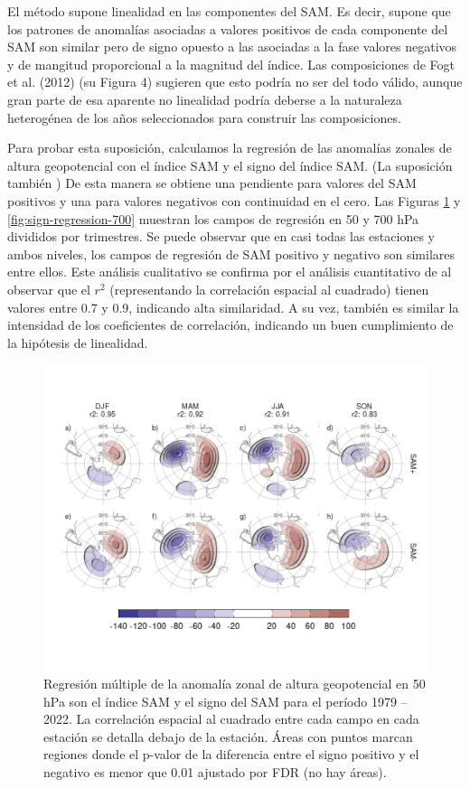 \documentclass[12pt,oneside]{reedthesis}
\begin{document}
El método supone linealidad en las componentes del SAM.
Es decir, supone que los patrones de anomalías asociadas a valores positivos de cada componente del SAM son similar pero de signo opuesto a las asociadas a la fase valores negativos y de mangitud proporcional a la magnitud del índice.
Las composiciones de Fogt et al. (2012) (su Figura 4) sugieren que esto podría no ser del todo válido, aunque gran parte de esa aparente no linealidad podría deberse a la naturaleza heterogénea de los años seleccionados para construir las composiciones.

Para probar esta suposición, calculamos la regresión de las anomalías zonales de altura geopotencial con el índice SAM y el signo del índice SAM.
(La suposición también )
De esta manera se obtiene una pendiente para valores del SAM positivos y una para valores negativos con continuidad en el cero.
Las Figuras \ref{fig:sign-regression-50} y \ref{fig:sign-regression-700} muestran los campos de regresión en 50 y 700 hPa divididos por trimestres.
Se puede observar que en casi todas las estaciones y ambos niveles, los campos de regresión de SAM positivo y negativo son similares entre ellos.
Este análisis cualitativo se confirma por el análisis cuantitativo de al observar que el \(r^2\) (representando la correlación espacial al cuadrado) tienen valores entre 0.7 y 0.9, indicando alta similaridad.
A su vez, también es similar la intensidad de los coeficientes de correlación, indicando un buen cumplimiento de la hipótesis de linealidad.





\begin{figure}
\includegraphics{figures/30-sam/sign-regression-50-1} \caption{Regresión múltiple de la anomalía zonal de altura geopotencial en 50 hPa son el índice SAM y el signo del SAM para el período 1979 -- 2022.
La correlación espacial al cuadrado entre cada campo en cada estación se detalla debajo de la estación.
Áreas con puntos marcan regiones donde el p-valor de la diferencia entre el signo positivo y el negativo es menor que 0.01 ajustado por FDR (no hay áreas).}\label{fig:sign-regression-50}
\end{figure}
\end{document}
